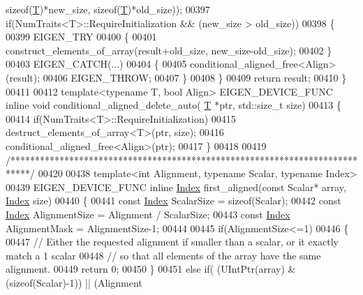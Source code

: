 \begin{DoxyCode}
{      sizeof}(\hyperlink{group___sparse_core___module_class_eigen_1_1_triplet}{T})*new\_size, \textcolor{keyword}{sizeof}(\hyperlink{group___sparse_core___module_class_eigen_1_1_triplet}{T})*old\_size));
00397   \textcolor{keywordflow}{if}(NumTraits<T>::RequireInitialization && (new\_size > old\_size))
00398   \{
00399     EIGEN\_TRY
00400     \{
00401       construct\_elements\_of\_array(result+old\_size, new\_size-old\_size);
00402     \}
00403     EIGEN\_CATCH(...)
00404     \{
00405       conditional\_aligned\_free<Align>(result);
00406       EIGEN\_THROW;
00407     \}
00408   \}
00409   \textcolor{keywordflow}{return} result;
00410 \}
00411 
00412 \textcolor{keyword}{template}<\textcolor{keyword}{typename} T, \textcolor{keywordtype}{bool} Align> EIGEN\_DEVICE\_FUNC \textcolor{keyword}{inline} \textcolor{keywordtype}{void} conditional\_aligned\_delete\_auto(
      \hyperlink{group___sparse_core___module_class_eigen_1_1_triplet}{T} *ptr, std::size\_t size)
00413 \{
00414   \textcolor{keywordflow}{if}(NumTraits<T>::RequireInitialization)
00415     destruct\_elements\_of\_array<T>(ptr, size);
00416   conditional\_aligned\_free<Align>(ptr);
00417 \}
00418 
00419 \textcolor{comment}{/****************************************************************************/}
00420 
00438 \textcolor{keyword}{template}<\textcolor{keywordtype}{int} Alignment, \textcolor{keyword}{typename} Scalar, \textcolor{keyword}{typename} Index>
00439 EIGEN\_DEVICE\_FUNC \textcolor{keyword}{inline} \hyperlink{namespace_eigen_a62e77e0933482dafde8fe197d9a2cfde}{Index} first\_aligned(\textcolor{keyword}{const} Scalar* array, \hyperlink{namespace_eigen_a62e77e0933482dafde8fe197d9a2cfde}{Index} size)
00440 \{
00441   \textcolor{keyword}{const} \hyperlink{namespace_eigen_a62e77e0933482dafde8fe197d9a2cfde}{Index} ScalarSize = \textcolor{keyword}{sizeof}(Scalar);
00442   \textcolor{keyword}{const} \hyperlink{namespace_eigen_a62e77e0933482dafde8fe197d9a2cfde}{Index} AlignmentSize = Alignment / ScalarSize;
00443   \textcolor{keyword}{const} \hyperlink{namespace_eigen_a62e77e0933482dafde8fe197d9a2cfde}{Index} AlignmentMask = AlignmentSize-1;
00444 
00445   \textcolor{keywordflow}{if}(AlignmentSize<=1)
00446   \{
00447     \textcolor{comment}{// Either the requested alignment if smaller than a scalar, or it exactly match a 1 scalar}
00448     \textcolor{comment}{// so that all elements of the array have the same alignment.}
00449     \textcolor{keywordflow}{return} 0;
00450   \}
00451   \textcolor{keywordflow}{else} \textcolor{keywordflow}{if}( (UIntPtr(array) & (\textcolor{keyword}{sizeof}(Scalar)-1)) || (Alignment%

\end{DoxyCode}
